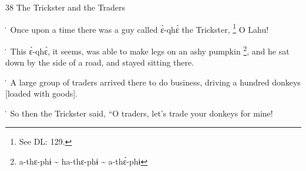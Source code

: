 
38 The Trickster and the Traders

\. Once upon a time there was a guy called ɛ̀-qhɛ̀ the Trickster, \footnote{See DL: 129.} O Lahu!

\. This ɛ̀-qhɛ̀, it seems, was able to make legs on an ashy pumpkin \footnote{a-thɛ-phɨ \textasciitilde{} ha-thɛ-phɨ \textasciitilde{} a-thɛ́-phɨ}, and
he sat down by the side of a road, and stayed sitting there.

\. A large group of traders arrived there to do business, driving a hundred donkeys
[loaded with goods].

\. So then the Trickster said, ``O traders, let's trade your donkeys for mine!
